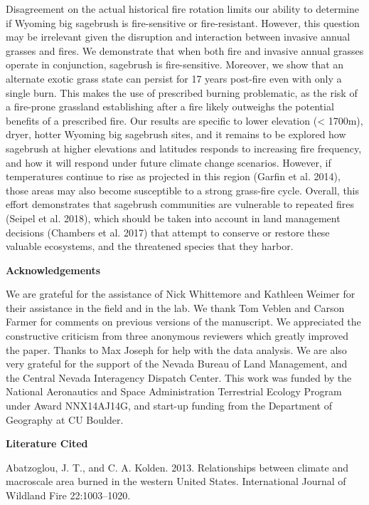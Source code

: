 \documentclass[12pt,]{article}
\begin{document}
Disagreement on the actual historical fire rotation limits our ability
to determine if Wyoming big sagebrush is fire-sensitive or
fire-resistant. However, this question may be irrelevant given the
disruption and interaction between invasive annual grasses and fires. We
demonstrate that when both fire and invasive annual grasses operate in
conjunction, sagebrush is fire-sensitive. Moreover, we show that an
alternate exotic grass state can persist for 17 years post-fire even
with only a single burn. This makes the use of prescribed burning
problematic, as the risk of a fire-prone grassland establishing after a
fire likely outweighs the potential benefits of a prescribed fire. Our
results are specific to lower elevation (\textless{} 1700m), dryer,
hotter Wyoming big sagebrush sites, and it remains to be explored how
sagebrush at higher elevations and latitudes responds to increasing fire
frequency, and how it will respond under future climate change
scenarios. However, if temperatures continue to rise as projected in
this region (Garfin et al. 2014), those areas may also become
susceptible to a strong grass-fire cycle. Overall, this effort
demonstrates that sagebrush communities are vulnerable to repeated fires
(Seipel et al. 2018), which should be taken into account in land
management decisions (Chambers et al. 2017) that attempt to conserve or
restore these valuable ecosystems, and the threatened species that they
harbor.

\textbf{Acknowledgements}

We are grateful for the assistance of Nick Whittemore and Kathleen
Weimer for their assistance in the field and in the lab. We thank Tom
Veblen and Carson Farmer for comments on previous versions of the
manuscript. We appreciated the constructive criticism from three
anonymous reviewers which greatly improved the paper. Thanks to Max
Joseph for help with the data analysis. We are also very grateful for
the support of the Nevada Bureau of Land Management, and the Central
Nevada Interagency Dispatch Center. This work was funded by the National
Aeronautics and Space Administration Terrestrial Ecology Program under
Award NNX14AJ14G, and start-up funding from the Department of Geography
at CU Boulder.

\textbf{Literature Cited} \singlespacing

\hypertarget{refs}{}
\hypertarget{ref-Abatzoglou2013}{}
Abatzoglou, J. T., and C. A. Kolden. 2013. Relationships between climate
and macroscale area burned in the western United States. International
Journal of Wildland Fire 22:1003--1020.
\end{document}

